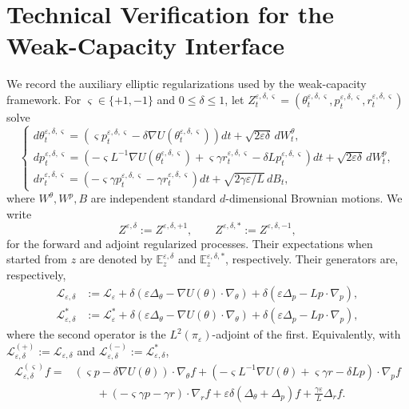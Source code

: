 \documentclass[11pt]{article}
\numberwithin{equation}{section}
\theoremstyle{plain}
\theoremstyle{definition}
\theoremstyle{remark}
\newcommand{\eps}{\varepsilon}
\newcommand{\E}{\mathbb E}
\newcommand{\calL}{\mathcal L}
\begin{document}
\section{Technical Verification for the Weak-Capacity Interface}
\label{app:weak-capacity-verification}
We record the auxiliary elliptic regularizations used by the
weak-capacity framework.  For
$\varsigma\in\{+1,-1\}$ and $0\le\delta\le1$, let
$Z_t^{\eps,\delta,\varsigma}
=\left(\theta_t^{\eps,\delta,\varsigma},p_t^{\eps,\delta,\varsigma},
r_t^{\eps,\delta,\varsigma}\right)$ solve
\begin{equation}\label{eq:ek-regularized-sde}
\begin{cases}
d\theta_t^{\eps,\delta,\varsigma}
=\left(\varsigma p_t^{\eps,\delta,\varsigma}
-\delta\nabla U\left(\theta_t^{\eps,\delta,\varsigma}\right)\right)dt
+\sqrt{2\eps\delta}\,dW_t^\theta,\\[1mm]
dp_t^{\eps,\delta,\varsigma}
=\left(-\varsigma L^{-1}\nabla U\left(\theta_t^{\eps,\delta,\varsigma}\right)
+\varsigma\gamma r_t^{\eps,\delta,\varsigma}
-\delta Lp_t^{\eps,\delta,\varsigma}\right)dt
+\sqrt{2\eps\delta}\,dW_t^p,\\[1mm]
dr_t^{\eps,\delta,\varsigma}
=\left(-\varsigma\gamma p_t^{\eps,\delta,\varsigma}
-\gamma r_t^{\eps,\delta,\varsigma}\right)dt
+\sqrt{2\gamma\eps/L}\,dB_t,
\end{cases}
\end{equation}
where $W^\theta,W^p,B$ are independent standard $d$-dimensional Brownian
motions.  We write
\[
    Z^{\eps,\delta}:=Z^{\eps,\delta,+1},
    \qquad
    Z^{\eps,\delta,*}:=Z^{\eps,\delta,-1},
\]
for the forward and adjoint regularized processes.  Their expectations when
started from $z$ are denoted by $\E_z^{\eps,\delta}$ and
$\E_z^{\eps,\delta,*}$, respectively.  Their generators are, respectively,
\begin{align}
\calL_{\eps,\delta}
&:=\calL_\eps
+\delta\left(\eps\Delta_\theta
-\nabla U(\theta)\cdot\nabla_\theta\right)
+\delta\left(\eps\Delta_p-Lp\cdot\nabla_p\right),
\label{eq:ek-forward-regularized-generator}\\
\calL_{\eps,\delta}^*
&:=\calL_\eps^*
+\delta\left(\eps\Delta_\theta
-\nabla U(\theta)\cdot\nabla_\theta\right)
+\delta\left(\eps\Delta_p-Lp\cdot\nabla_p\right),
\label{eq:ek-adjoint-regularized-generator}
\end{align}
where the second operator is the $L^2(\pi_\eps)$-adjoint of the first.
Equivalently, with
$\calL_{\eps,\delta}^{(+)}:=\calL_{\eps,\delta}$ and
$\calL_{\eps,\delta}^{(-)}:=\calL_{\eps,\delta}^*$,
\begin{equation}\label{eq:ek-signed-regularized-generator}
\begin{aligned}
\calL_{\eps,\delta}^{(\varsigma)}f
=&(\varsigma p-\delta\nabla U(\theta))\cdot\nabla_\theta f+\left(-\varsigma L^{-1}\nabla U(\theta)
    +\varsigma\gamma r-\delta Lp\right)\cdot\nabla_p f\\
&\qquad+(-\varsigma\gamma p-\gamma r)\cdot\nabla_r f
+\eps\delta(\Delta_\theta+\Delta_p)f
+\frac{\gamma\eps}{L}\Delta_r f .
\end{aligned}
\end{equation}
\end{document}
